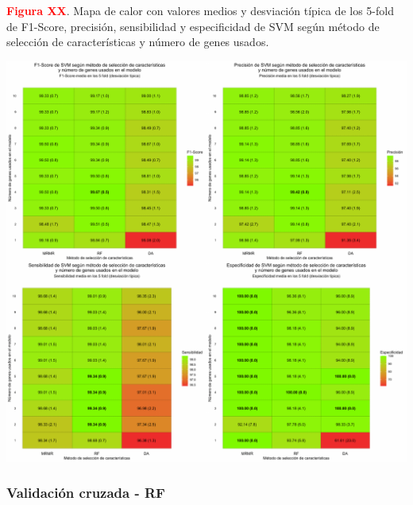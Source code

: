 \textbf{\textcolor{red}{Figura XX}}. Mapa de calor con valores medios y desviación típica de los 5-fold de F1-Score, precisión, sensibilidad y especificidad de SVM según método de selección de características y número de genes usados.
\begin{center}
	\includegraphics[width=1\textwidth]{figuras/higado_biclase_heatmap_svm.pdf} \\
\end{center}

\newpage
\subsubsection{Validación cruzada - RF}

